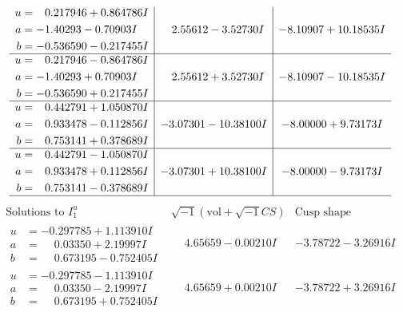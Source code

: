 \documentclass[1p]{elsarticle_modified}
\theoremstyle{definition}
\newcommand{\I}{\sqrt{-1}}
\begin{document}
$$\begin{array}{c|c|c}
\begin{aligned}
u &= \phantom{-}0.217946 + 0.864786 I \\
a &= -1.40293 - 0.70903 I \\
b &= -0.536590 - 0.217455 I\end{aligned}
 & \phantom{-}2.55612 - 3.52730 I & -8.10907 + 10.18535 I \\ \hline\begin{aligned}
u &= \phantom{-}0.217946 - 0.864786 I \\
a &= -1.40293 + 0.70903 I \\
b &= -0.536590 + 0.217455 I\end{aligned}
 & \phantom{-}2.55612 + 3.52730 I & -8.10907 - 10.18535 I \\ \hline\begin{aligned}
u &= \phantom{-}0.442791 + 1.050870 I \\
a &= \phantom{-}0.933478 - 0.112856 I \\
b &= \phantom{-}0.753141 + 0.378689 I\end{aligned}
 & -3.07301 - 10.38100 I & -8.00000 + 9.73173 I \\ \hline\begin{aligned}
u &= \phantom{-}0.442791 - 1.050870 I \\
a &= \phantom{-}0.933478 + 0.112856 I \\
b &= \phantom{-}0.753141 - 0.378689 I\end{aligned}
 & -3.07301 + 10.38100 I & -8.00000 - 9.73173 I\\
 \hline 
 \end{array}$$\newpage$$\begin{array}{c|c|c}  
\text{Solutions to }I^u_{1}& \I (\text{vol} + \sqrt{-1}CS) & \text{Cusp shape}\\
 \hline 
\begin{aligned}
u &= -0.297785 + 1.113910 I \\
a &= \phantom{-}0.03350 + 2.19997 I \\
b &= \phantom{-}0.673195 - 0.752405 I\end{aligned}
 & \phantom{-}4.65659 - 0.00210 I & -3.78722 - 3.26916 I \\ \hline\begin{aligned}
u &= -0.297785 - 1.113910 I \\
a &= \phantom{-}0.03350 - 2.19997 I \\
b &= \phantom{-}0.673195 + 0.752405 I\end{aligned}
 & \phantom{-}4.65659 + 0.00210 I & -3.78722 + 3.26916 I \\ \hline\begin{aligned}

\end{aligned}
\end{array}$$
\end{document}
